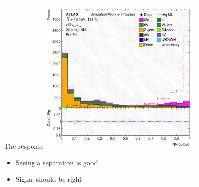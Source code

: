 \begin{frame}{The response}
  \centering \includegraphics[width=0.6\textwidth]{response_binary}
  \begin{itemize}
    \item Seeing a separation is good
    \item Signal should be right
  \end{itemize}
\end{frame}
